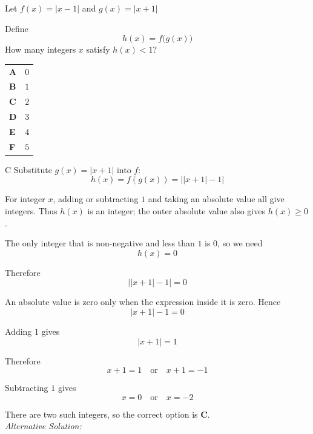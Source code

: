\documentclass[11pt,a4paper]{article}
\begin{document}
\clearpage
\thispagestyle{djssolutions}
\vspace*{8pt}
\begin{enumerate}[label=\textbf{\arabic*.},leftmargin=*,itemsep=0pt,start=14]
Let $f(x)=|x-1|$ and $g(x)=|x+1|$

Define \[ h(x)=f\bigl(g(x)\bigr) \] How many integers $x$ satisfy $h(x)<1$?

\par\vspace*{12pt}
\begin{tabularx}{\linewidth}{@{}>{\bfseries}l Y@{}}
A &
$0$
\\[0.8em]
B &
$1$
\\[0.8em]
C &
$2$
\\[0.8em]
D &
$3$
\\[0.8em]
E &
$4$
\\[0.8em]
F &
$5$
\\
\end{tabularx}

\begin{djsSolution}{C}
Substitute $g(x)=|x+1|$ into $f$:
\[
h(x)=f(g(x))=\bigl||x+1|-1\bigr|
\]

For integer $x$, adding or subtracting $1$ and taking an absolute value all give integers. Thus $h(x)$ is an integer; the outer absolute value also gives $h(x)\ge0$.

The only integer that is non-negative and less than $1$ is $0$, so we need
\[
h(x)=0
\]

Therefore
\[
\bigl||x+1|-1\bigr|=0
\]

An absolute value is zero only when the expression inside it is zero. Hence
\[
|x+1|-1=0
\]

Adding $1$ gives
\[
|x+1|=1
\]

Therefore
\[
x+1=1\quad\text{or}\quad x+1=-1
\]

Subtracting $1$ gives
\[
x=0\quad\text{or}\quad x=-2
\]

There are two such integers, so the correct option is \textbf{C}.\\[5pt]

\textit{Alternative Solution:}


\end{djsSolution}
\end{enumerate}
\end{document}
